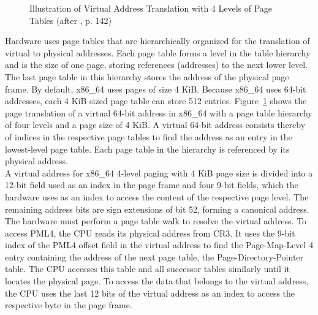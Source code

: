 \begin{figure}
  \begin{center}
    
    \caption{Illustration of Virtual Address Translation with 4 Levels of Page Tables (after \cite{amd_manual}, p. 142)}
    \label{fig:state:technical:paging}
  \end{center}
\end{figure}

Hardware uses page tables that are hierarchically organized for the translation
of virtual to physical addresses. Each page table forms a level in the table
hierarchy and is the size of one page, storing references (addresses) to the
next lower level. The last page table in this hierarchy stores the address of
the physical page frame. By default, x86\_64 uses pages of size 4 KiB. Because
x86\_64 uses 64-bit addresses, each 4 KiB sized page table can store 512
entries. Figure~\ref{fig:state:technical:paging} shows the page translation of a
virtual 64-bit address in x86\_64 with a page table hierarchy of four levels and
a page size of 4 KiB. A virtual 64-bit address consists thereby of indices in
the respective page tables to find the address as an entry in the lowest-level
page table. Each page table in the hierarchy is referenced by its physical
address.\\

A virtual address for x86\_64 4-level paging with 4 KiB page size is divided
into a 12-bit field used as an index in the page frame and four 9-bit fields,
which the hardware uses as an index to access the content of the respective page
level. The remaining address bits are sign extensions of bit 52, forming a
canonical address. The hardware must perform a page table walk to resolve the
virtual address.
To access PML4, the CPU reads its physical address from CR3. It
uses the 9-bit index of the PML4 offset field in the virtual address to find the
Page-Map-Level 4 entry containing the address of the next page table, the
Page-Directory-Pointer table. The CPU accesses this table and all successor
tables similarly until it locates the physical page. To access the data that
belongs to the virtual address, the CPU uses the last 12 bits of the virtual
address as an index to access the respective byte in the page frame. \\

